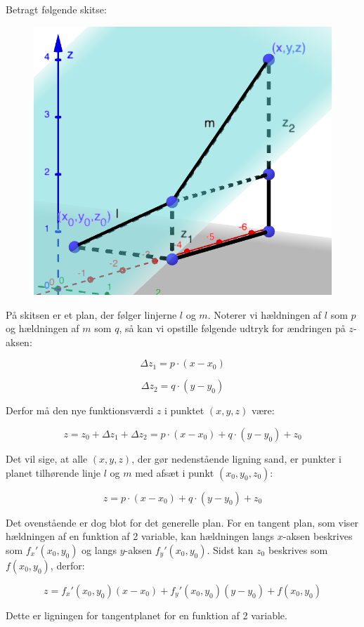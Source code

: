 \begin{proofw}

Betragt følgende skitse:

\begin{figure}[h]
    \centering
    \includegraphics[scale=0.5]{skitser/tangent_plan.png}
\end{figure}

På skitsen er et plan, der følger linjerne $l$ og $m$.
Noterer vi hældningen af $l$ som $p$ og hældningen af $m$ som $q$,
så kan vi opstille følgende udtryk for ændringen på $z$-aksen:

$$
    \Delta z_1=p \cdot (x-x_0)
$$

$$
    \Delta z_2=q \cdot (y-y_0)
$$

Derfor må den nye funktionsværdi $z$ i punktet $(x,y,z)$ være:

$$
    z=z_0+\Delta z_1+\Delta z_2=p \cdot (x-x_0)+q \cdot (y-y_0) + z_0
$$

Det vil sige, at alle $(x,y,z)$, der gør nedenstående ligning sand, er punkter i planet tilhørende
linje $l$ og $m$ med afsæt i punkt $(x_0,y_0,z_0)$:

$$
z=p \cdot (x-x_0)+q \cdot (y-y_0) + z_0
$$

Det ovenstående er dog blot for det generelle plan.
For en tangent plan, som viser hældningen af en funktion af 2 variable,
kan hældningen langs $x$-aksen beskrives som $f_x'(x_0,y_0)$
og langs $y$-aksen $f_y'(x_0,y_0)$.
Sidst kan $z_0$ beskrives som $f(x_0,y_0)$, derfor:

$$
    z=f_x'(x_0,y_0)(x-x_0)+
    f_y'(x_0,y_0)(y-y_0)+
    f(x_0,y_0)
$$

Dette er ligningen for tangentplanet for en funktion af 2 variable.

\end{proofw}

